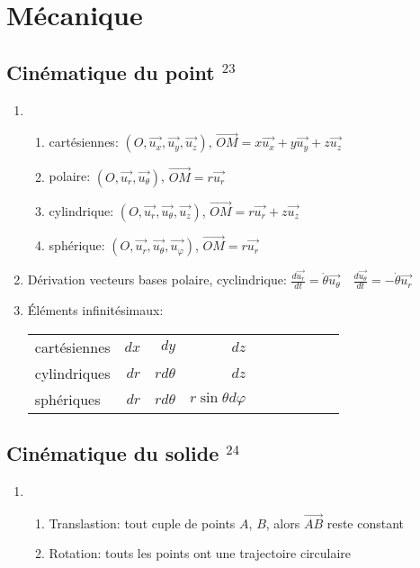 \documentclass[fleqn]{article}
\theoremstyle{definition} \newtheorem*{defi}{D\'efinition}
\theoremstyle{definition} \newtheorem*{theo}{Th\'eor\`eme}
\theoremstyle{definition} \newtheorem*{coro}{Corollaire}
\theoremstyle{remark} \newtheorem*{rqs}{Remarques}
\theoremstyle{definition} \newtheorem*{prop}{Propri\'et\'e}
\begin{document}
\newpage

\section{M\'ecanique}
\subsection{Cin\'ematique du point $^{23}$}
\begin{enumerate}
	\item \begin{enumerate}
		\item cart\'esiennes: $(O, \vec{u_x}, \vec{u_y}, \vec{u_z})$, $\vec{OM} = x \vec{u_x} + y \vec{u_y} + z \vec{u_z}$
		\item polaire: $(O, \vec{u_r}, \vec{u_\theta})$, $\vec{OM} = r \vec{u_r}$
		\item cylindrique: $(O, \vec{u_r}, \vec{u_\theta}, \vec{u_z})$, $\vec{OM} = r \vec{u_r} + z\vec{u_z}$
		\item sph\'erique: $(O, \vec{u_r}, \vec{u_\theta}, \vec{u_\varphi})$, $\vec{OM} = r \vec{u_r}$
	\end{enumerate}
	\item D\'erivation vecteurs bases polaire, cyclindrique: $\frac{d\vec{u_r}}{dt} = \dot \theta \vec{u_\theta} \quad
		\frac{d\vec{u_\theta}}{dt} = - \dot \theta \vec{u_r}$
	\item \'El\'ements infinit\'esimaux:\\
	\begin{tabular}{@{}lrrrrrrrrr@{}}
		cart\'esiennes & $dx$ & $dy$ & $dz$ \\
		cylindriques & $dr$ & $rd \theta$ & $dz$ \\
		sph\'eriques & $dr$ & $rd \theta$ & $r \sin \theta d \varphi$ \\
	\end{tabular}
\end{enumerate}

\subsection{Cin\'ematique du solide $^{24}$}
\begin{enumerate}
	\item \begin{enumerate}
		\item Translastion: tout cuple de points $A$, $B$, alors $\vec{AB}$ reste constant
		\item Rotation: touts les points ont une trajectoire circulaire
	\end{enumerate}
\end{enumerate}
\end{document}
